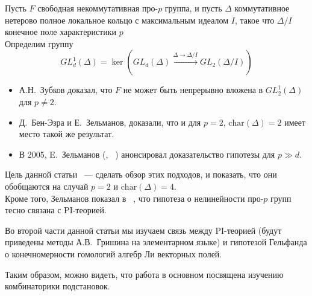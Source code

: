 Пусть $F$ свободная некоммутативная про-$p$ группа, и пусть $\Delta$ коммутативное нетерово полное локальное кольцо с максимальным идеалом $I$, такое что
$\Delta/I$ конечное поле характеристики $p$\\
Определим группу
\[GL_d^1(\Delta) = \ker\left( GL_d(\Delta) \xrightarrow{\Delta\to\Delta/I} GL_2(\Delta/I) \right)\]
\begin{itemize}
    \item А.Н.\ Зубков доказал, что $F$ не может быть непрерывно вложена в $GL_2^1(\Delta)$ для $p\neq2$.
    \item Д.\ Бен-Эзра и Е.\ Зельманов, доказали, что и для $p=2$, $\mathrm{char}(\Delta)=2$ имеет место такой же результат.
    \item В 2005, E.\ Зельманов (\cite{Zelmanov1}, ~\cite{Zelmanov2}) анонсировал доказательство гипотезы для $p\gg d$.
\end{itemize}

Цель данной статьи ~--- сделать обзор этих подходов, и показать, что они обобщаются на случай $p=2$ и $\mathrm{char}(\Delta)=4$.\\
Кроме того, Зельманов показал в ~\cite{Zelmanov1}, что гипотеза о нелинейности про-$p$ групп тесно связана с PI-теорией.

Во второй части данной статьи мы изучаем связь между PI-теорией (будут приведены методы А.В.\ Гришина на элементарном языке)
и гипотезой Гельфанда о конечномерности гомологий алгебр Ли векторных полей.

Таким образом, можно видеть, что работа в основном посвящена изучению комбинаторики подстановок.